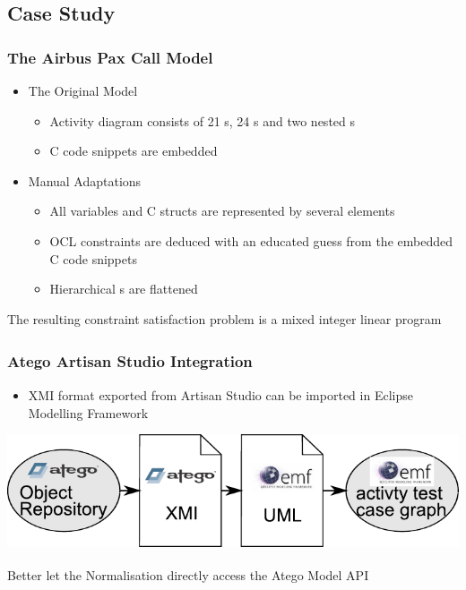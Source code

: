 \documentclass{beamer}
\begin{document}
\subsection{Case Study}
\begin{frame}
\frametitle{The Airbus Pax Call Model}
\begin{itemize}
  \item The Original Model
\begin{itemize}
  \item Activity diagram consists of 21 s, 24 s and two nested s
  \item C code snippets are embedded
\end{itemize}
  \item Manual Adaptations
  \begin{itemize}
  \item All variables and C structs are represented by several  elements
  \item OCL constraints are deduced with an educated guess from the embedded C code snippets
  \item Hierarchical s are flattened
\end{itemize}
\end{itemize}
\begin{block}{}
The resulting constraint satisfaction problem is a mixed integer linear program
\end{block}
\end{frame}
\begin{frame}
\frametitle{Atego\textsuperscript{\textregistered} Artisan Studio Integration}
\begin{itemize}
  \item XMI format exported from Artisan Studio can be imported in Eclipse Modelling Framework
\end{itemize}
\includegraphics[width=\textwidth]{./pics/AtegoATCGConversion.pdf}
\begin{block}{}
Better let the Normalisation directly access the Atego\textsuperscript{\textregistered} Model API
\end{block}
\end{frame}
\end{document}
